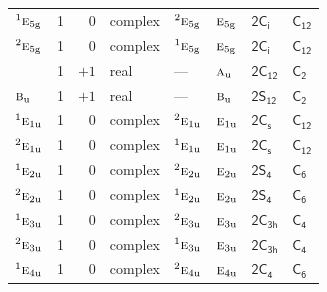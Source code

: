 \documentclass[10pt,a4paper]{article}
\numberwithin{equation}{section}
\newcommand{\grp}[1]{\mathsf{#1}}
\newcommand{\irr}[1]{\text{\normalfont\scshape #1}}
\newcommand{\conjpair}[1]{{}^{#1}}
\newcommand{\detbox}[1]{{\setlength{\fboxsep}{1pt}\fbox{#1}}}
\newcommand{\ptag}[1]{\mathrm{#1}}
\begin{document}
{\begin{longtable}{@{}lrrlllll@{}}
$\conjpair{1}\irr{e}_{5\ptag{g}}$ & 1 & $0$ & complex & $\conjpair{2}\irr{e}_{5\ptag{g}}$ & $\irr{e}_{5\ptag{g}}$ & \href{2S2.pdf}{$\grp{2C_{i}}$} & \href{../../../rotation/data/pdf/C12.pdf}{$\grp{C_{12}}$}\\
$\conjpair{2}\irr{e}_{5\ptag{g}}$ & 1 & $0$ & complex & $\conjpair{1}\irr{e}_{5\ptag{g}}$ & $\irr{e}_{5\ptag{g}}$ & \href{2S2.pdf}{$\grp{2C_{i}}$} & \href{../../../rotation/data/pdf/C12.pdf}{$\grp{C_{12}}$}\\
\detbox{$\irr{a}_{\ptag{u}}$} & 1 & $+1$ & real & --- & $\irr{a}_{\ptag{u}}$ & \href{2C12.pdf}{$\grp{2C_{12}}$} & \href{../../../rotation/data/pdf/C2.pdf}{$\grp{C_{2}}$}\\
$\irr{b}_{\ptag{u}}$ & 1 & $+1$ & real & --- & $\irr{b}_{\ptag{u}}$ & \href{2S12.pdf}{$\grp{2S_{12}}$} & \href{../../../rotation/data/pdf/C2.pdf}{$\grp{C_{2}}$}\\
$\conjpair{1}\irr{e}_{1\ptag{u}}$ & 1 & $0$ & complex & $\conjpair{2}\irr{e}_{1\ptag{u}}$ & $\irr{e}_{1\ptag{u}}$ & \href{2C1v.pdf}{$\grp{2C_{s}}$} & \href{../../../rotation/data/pdf/C12.pdf}{$\grp{C_{12}}$}\\
$\conjpair{2}\irr{e}_{1\ptag{u}}$ & 1 & $0$ & complex & $\conjpair{1}\irr{e}_{1\ptag{u}}$ & $\irr{e}_{1\ptag{u}}$ & \href{2C1v.pdf}{$\grp{2C_{s}}$} & \href{../../../rotation/data/pdf/C12.pdf}{$\grp{C_{12}}$}\\
$\conjpair{1}\irr{e}_{2\ptag{u}}$ & 1 & $0$ & complex & $\conjpair{2}\irr{e}_{2\ptag{u}}$ & $\irr{e}_{2\ptag{u}}$ & \href{2S4.pdf}{$\grp{2S_{4}}$} & \href{../../../rotation/data/pdf/C6.pdf}{$\grp{C_{6}}$}\\
$\conjpair{2}\irr{e}_{2\ptag{u}}$ & 1 & $0$ & complex & $\conjpair{1}\irr{e}_{2\ptag{u}}$ & $\irr{e}_{2\ptag{u}}$ & \href{2S4.pdf}{$\grp{2S_{4}}$} & \href{../../../rotation/data/pdf/C6.pdf}{$\grp{C_{6}}$}\\
$\conjpair{1}\irr{e}_{3\ptag{u}}$ & 1 & $0$ & complex & $\conjpair{2}\irr{e}_{3\ptag{u}}$ & $\irr{e}_{3\ptag{u}}$ & \href{2C3h.pdf}{$\grp{2C_{3h}}$} & \href{../../../rotation/data/pdf/C4.pdf}{$\grp{C_{4}}$}\\
$\conjpair{2}\irr{e}_{3\ptag{u}}$ & 1 & $0$ & complex & $\conjpair{1}\irr{e}_{3\ptag{u}}$ & $\irr{e}_{3\ptag{u}}$ & \href{2C3h.pdf}{$\grp{2C_{3h}}$} & \href{../../../rotation/data/pdf/C4.pdf}{$\grp{C_{4}}$}\\
$\conjpair{1}\irr{e}_{4\ptag{u}}$ & 1 & $0$ & complex & $\conjpair{2}\irr{e}_{4\ptag{u}}$ & $\irr{e}_{4\ptag{u}}$ & \href{2C4.pdf}{$\grp{2C_{4}}$} & \href{../../../rotation/data/pdf/C6.pdf}{$\grp{C_{6}}$}\\

\end{longtable}}
\end{document}

